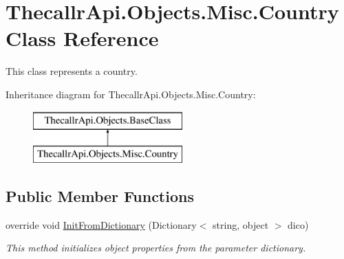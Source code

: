 \hypertarget{class_thecallr_api_1_1_objects_1_1_misc_1_1_country}{\section{Thecallr\+Api.\+Objects.\+Misc.\+Country Class Reference}
\label{class_thecallr_api_1_1_objects_1_1_misc_1_1_country}
}


This class represents a country.  


Inheritance diagram for Thecallr\+Api.\+Objects.\+Misc.\+Country\+:\begin{figure}[H]
\begin{center}
\leavevmode
\includegraphics[height=2.000000cm]{class_thecallr_api_1_1_objects_1_1_misc_1_1_country}
\end{center}
\end{figure}
\subsection*{Public Member Functions}
\begin{DoxyCompactItemize}
\item 
override void \hyperlink{class_thecallr_api_1_1_objects_1_1_misc_1_1_country_a7c6f63ce6878d406a608f431b9f917e2}{Init\+From\+Dictionary} (Dictionary$<$ string, object $>$ dico)
\begin{DoxyCompactList}\small\item\em This method initializes object properties from the parameter dictionary. \end{DoxyCompactList}\end{DoxyCompactItemize}
